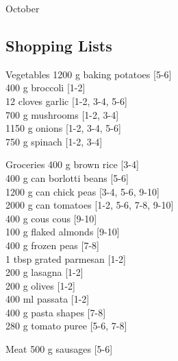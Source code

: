 \begin{menu}{October}
    \subsection*{Shopping Lists}
      \begin{shoppinglist}{Vegetables}
      1200 g baking potatoes 
        {\scriptsize[5-6]}\\
      400 g broccoli 
        {\scriptsize[1-2]}\\
      12 cloves garlic 
        {\scriptsize[1-2, 3-4, 5-6]}\\
      700 g mushrooms 
        {\scriptsize[1-2, 3-4]}\\
      1150 g onions 
        {\scriptsize[1-2, 3-4, 5-6]}\\
      750 g spinach 
        {\scriptsize[1-2, 3-4]}\\
      \end{shoppinglist}%
      \begin{shoppinglist}{Groceries}
      400 g brown rice 
        {\scriptsize[3-4]}\\
      400 g can borlotti beans 
        {\scriptsize[5-6]}\\
      1200 g can chick peas 
        {\scriptsize[3-4, 5-6, 9-10]}\\
      2000 g can tomatoes 
        {\scriptsize[1-2, 5-6, 7-8, 9-10]}\\
      400 g cous cous 
        {\scriptsize[9-10]}\\
      100 g flaked almonds 
        {\scriptsize[9-10]}\\
      400 g frozen peas 
        {\scriptsize[7-8]}\\
      1 tbsp grated parmesan 
        {\scriptsize[1-2]}\\
      200 g lasagna 
        {\scriptsize[1-2]}\\
      200 g olives 
        {\scriptsize[1-2]}\\
      400 ml passata 
        {\scriptsize[1-2]}\\
      400 g pasta shapes 
        {\scriptsize[7-8]}\\
      280 g tomato puree 
        {\scriptsize[5-6, 7-8]}\\
      \end{shoppinglist}%
      \par\vfil %
      \begin{shoppinglist}{Meat}
      500 g sausages 
        {\scriptsize[5-6]}\\

\end{shoppinglist}
\end{menu}
